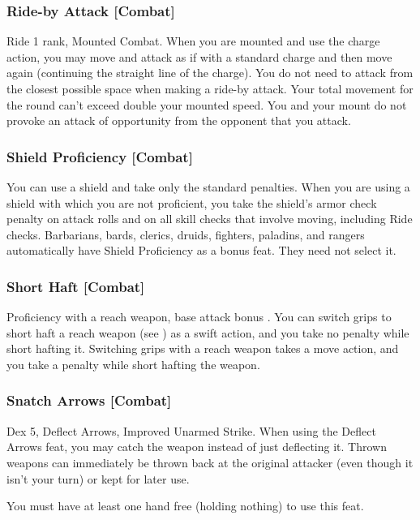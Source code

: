 \subsubsection{Ride-by Attack [Combat]}
 Ride 1 rank, Mounted Combat.
 When you are mounted and use the charge action, you may move and attack as if with a standard charge and then move again (continuing the straight line of the charge). You do not need to attack from the closest possible space when making a ride-by attack. Your total movement for the round can't exceed double your mounted speed. You and your mount do not provoke an attack of opportunity from the opponent that you attack.%

\subsubsection{Shield Proficiency [Combat]}
 You can use a shield and take only the standard penalties.
 When you are using a shield with which you are not proficient, you take the shield's armor check penalty on attack rolls and on all skill checks that involve moving, including Ride checks.
 Barbarians, bards, clerics, druids, fighters, paladins, and rangers automatically have Shield Proficiency as a bonus feat. They need not select it.

\subsubsection{Short Haft [Combat]}
 Proficiency with a reach weapon, base attack bonus .
 You can switch grips to short haft a reach weapon (see ) as a swift action, and you take no penalty while short hafting it.
 Switching grips with a reach weapon takes a move action, and you take a  penalty while short hafting the weapon.

\subsubsection{Snatch Arrows [Combat]}
 Dex 5, Deflect Arrows, Improved Unarmed Strike.
 When using the Deflect Arrows feat, you may catch the weapon instead of just deflecting it. Thrown weapons can immediately be thrown back at the original attacker (even though it isn't your turn) or kept for later use.
\par You must have at least one hand free (holding nothing) to use this feat.%

